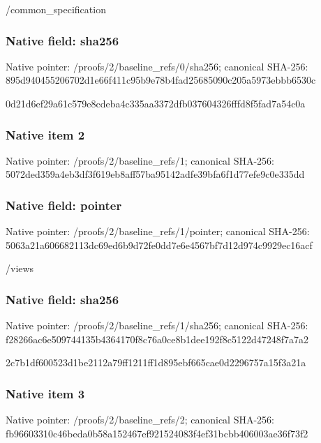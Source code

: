 \documentclass[10pt,a4paper]{article}
\begin{document}
\begingroup\raggedright\sloppy /\allowbreak{}common\_\allowbreak{}specification\par\endgroup

\subsubsection{Native field: sha256}
Native pointer: /proofs/2/baseline\_\allowbreak{}refs/0/sha256; canonical SHA-256: 895d940455206702d1e66f411c95b9e78b4fad25685090c205a5973ebbb6530c

\begingroup\raggedright\sloppy 0d21d6ef29a61c579e8cdeba4c335aa3372dfb037604326fffd8f5fad7a54c0a\par\endgroup

\subsubsection{Native item 2}
Native pointer: /proofs/2/baseline\_\allowbreak{}refs/1; canonical SHA-256: 5072ded359a4eb3df3f619eb8aff57ba95142adfe39bfa6f1d77efe9c0e335dd

\subsubsection{Native field: pointer}
Native pointer: /proofs/2/baseline\_\allowbreak{}refs/1/pointer; canonical SHA-256: 5063a21a606682113dc69ed6b9d72fe0dd7e6e4567bf7d12d974c9929ec16acf

\begingroup\raggedright\sloppy /\allowbreak{}views\par\endgroup

\subsubsection{Native field: sha256}
Native pointer: /proofs/2/baseline\_\allowbreak{}refs/1/sha256; canonical SHA-256: f28266ac6e509744135b4364170f8c76a0ce8b1dee192f8c5122d47248f7a7a2

\begingroup\raggedright\sloppy 2c7b1df600523d1be2112a79ff1211ff1d895ebf665cae0d2296757a15f3a21a\par\endgroup

\subsubsection{Native item 3}
Native pointer: /proofs/2/baseline\_\allowbreak{}refs/2; canonical SHA-256: fb96603310c46beda0b58a152467ef921524083f4ef31bcbb406003ae36f73f2
\end{document}
